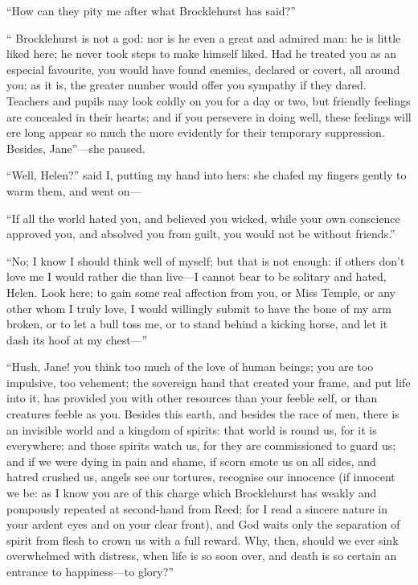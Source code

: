 \enquote{How can they pity me after what \Mr{} Brocklehurst has said?}

\enquote{\Mr{} Brocklehurst is not a god: nor is he even a great and
admired man: he is little liked here; he never took steps to make
himself liked. Had he treated you as an especial favourite, you would
have found enemies, declared or covert, all around you; as it is, the
greater number would offer you sympathy if they dared. Teachers and
pupils may look coldly on you for a day or two, but friendly feelings
are concealed in their hearts; and if you persevere in doing well, these
feelings will ere long appear so much the more evidently for their
temporary suppression. Besides, Jane}---she paused.

\enquote{Well, Helen?} said I, putting my hand into hers: she chafed my
fingers gently to warm them, and went on---

\enquote{If all the world hated you, and believed you wicked, while your
own conscience approved you, and absolved you from guilt, you would not
be without friends.}

\enquote{No; I know I should think well of myself; but that is not
enough: if others don't love me I would rather die than live---I cannot
bear to be solitary and hated, Helen. Look here; to gain some real
affection from you, or Miss Temple, or any other whom I truly love, I
would willingly submit to have the bone of my arm broken, or to let a
bull toss me, or to stand behind a kicking horse, and let it dash its
hoof at my chest---}

\enquote{Hush, Jane! you think too much of the love of human beings; you
are too impulsive, too vehement; the sovereign hand that created your
frame, and put life into it, has provided you with other resources than
your feeble self, or than creatures feeble as you. Besides this earth,
and besides the race of men, there is an invisible world and a kingdom
of spirits: that world is round us, for it is everywhere; and those
spirits watch us, for they are commissioned to guard us; and if we were
dying in pain and shame, if scorn smote us on all sides, and hatred
crushed us, angels see our tortures, recognise our innocence (if
innocent we be: as I know you are of this charge which \Mr{} Brocklehurst
has weakly and pompously repeated at second-hand from \Mrs{} Reed; for I
read a sincere nature in your ardent eyes and on your clear front), and
God waits only the separation of spirit from flesh to crown us with a
full reward. Why, then, should we ever sink overwhelmed with distress,
when life is so soon over, and death is so certain an entrance to
happiness---to glory?}

